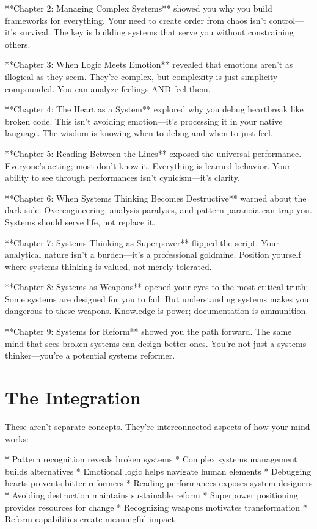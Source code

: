 \documentclass[12pt,oneside]{book}
\begin{document}
**Chapter 2: Managing Complex Systems** showed you why you build frameworks for everything. Your need to create order from chaos isn't control---it's survival. The key is building systems that serve you without constraining others.

**Chapter 3: When Logic Meets Emotion** revealed that emotions aren't as illogical as they seem. They're complex, but complexity is just simplicity compounded. You can analyze feelings AND feel them.

**Chapter 4: The Heart as a System** explored why you debug heartbreak like broken code. This isn't avoiding emotion---it's processing it in your native language. The wisdom is knowing when to debug and when to just feel.

**Chapter 5: Reading Between the Lines** exposed the universal performance. Everyone's acting; most don't know it. Everything is learned behavior. Your ability to see through performances isn't cynicism---it's clarity.

**Chapter 6: When Systems Thinking Becomes Destructive** warned about the dark side. Overengineering, analysis paralysis, and pattern paranoia can trap you. Systems should serve life, not replace it.

**Chapter 7: Systems Thinking as Superpower** flipped the script. Your analytical nature isn't a burden---it's a professional goldmine. Position yourself where systems thinking is valued, not merely tolerated.

**Chapter 8: Systems as Weapons** opened your eyes to the most critical truth: Some systems are designed for you to fail. But understanding systems makes you dangerous to these weapons. Knowledge is power; documentation is ammunition.

**Chapter 9: Systems for Reform** showed you the path forward. The same mind that sees broken systems can design better ones. You're not just a systems thinker---you're a potential systems reformer.

\section{The Integration}

These aren't separate concepts. They're interconnected aspects of how your mind works:

                    * Pattern recognition reveals broken systems
                    * Complex systems management builds alternatives
                    * Emotional logic helps navigate human elements
                    * Debugging hearts prevents bitter reformers
                    * Reading performances exposes system designers
                    * Avoiding destruction maintains sustainable reform
                    * Superpower positioning provides resources for change
                    * Recognizing weapons motivates transformation
                    * Reform capabilities create meaningful impact
\end{document}
